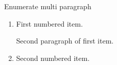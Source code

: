 \documentclass[14pt,t]{beamer}
\begin{document}
\begin{frame}{Enumerate multi paragraph}
\begin{enumerate}
\item First numbered item.

  Second paragraph of first item.
\item Second numbered item.
\end{enumerate}
\end{frame}
\end{document}
